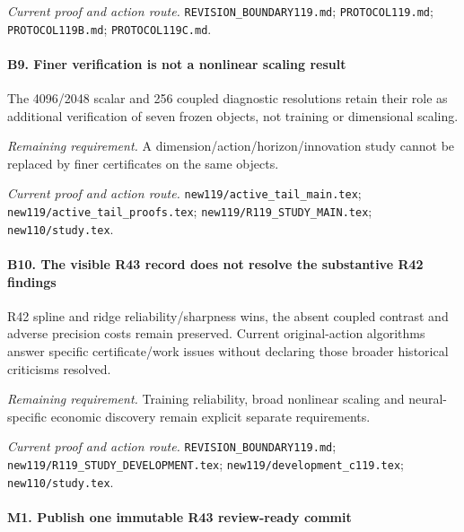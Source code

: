 \par\emph{Current proof and action route.} \nolinkurl{REVISION_BOUNDARY119.md}; \nolinkurl{PROTOCOL119.md}; \nolinkurl{PROTOCOL119B.md}; \nolinkurl{PROTOCOL119C.md}.

\paragraph{B9. Finer verification is not a nonlinear scaling result}

The 4096/2048 scalar and 256 coupled diagnostic resolutions retain their role as additional verification of seven frozen objects, not training or dimensional scaling.

\par\emph{Remaining requirement.} A dimension/\allowbreak{}action/\allowbreak{}horizon/\allowbreak{}innovation study cannot be replaced by finer certificates on the same objects.

\par\emph{Current proof and action route.} \nolinkurl{new119/active_tail_main.tex}; \nolinkurl{new119/active_tail_proofs.tex}; \nolinkurl{new119/R119_STUDY_MAIN.tex}; \nolinkurl{new110/study.tex}.

\paragraph{B10. The visible R43 record does not resolve the substantive R42 findings}

R42 spline and ridge reliability/\allowbreak{}sharpness wins, the absent coupled contrast and adverse precision costs remain preserved. Current original-action algorithms answer specific certificate/\allowbreak{}work issues without declaring those broader historical criticisms resolved.

\par\emph{Remaining requirement.} Training reliability, broad nonlinear scaling and neural-specific economic discovery remain explicit separate requirements.

\par\emph{Current proof and action route.} \nolinkurl{REVISION_BOUNDARY119.md}; \nolinkurl{new119/R119_STUDY_DEVELOPMENT.tex}; \nolinkurl{new119/development_c119.tex}; \nolinkurl{new110/study.tex}.

\paragraph{M1. Publish one immutable R43 review-ready commit}

